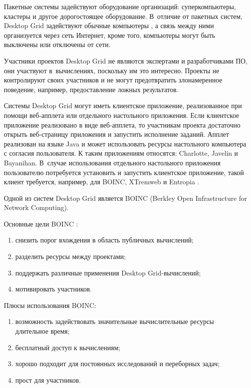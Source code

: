 Пакетные системы задействуют оборудование организаций: суперкомпьютеры, кластеры и другое дорогостоящее оборудование. В~отличие от пакетных систем, Desktop Grid задействуют обычные компьютеры \cite{Anderson2004Boinc}, а связь между ними организуется через сеть Интернет, кроме того,  компьютеры могут быть выключены или отключены от сети. 

Участники проектов Desktop Grid не являются экспертами и разработчиками ПО, они участвуют в~вычислениях, поскольку им это интересно. Проекты не контролируют своих участников и не могут предотвратить злонамеренное поведение, например, предоставление ложных результатов. 



Системы Desktop Grid могут иметь клиентское приложение, реализованное при помощи веб-апплета или отдельного настольного приложения. Если клиентское приложение реализовано в виде веб-апплета, то участникам проекта достаточно открыть веб-страницу приложения и запустить исполнение заданий. Апплет реализован на языке Java и может использовать ресурсы настольного компьютера с согласия пользователя. К таким приложениям относятся: Charlotte, Javelin и Bayanihan.  В~случае использования отдельного настольного приложения пользователю потребуется установить и запустить клиентское приложение, такой клиент требуется, например, для BOINC, XTremweb и Entropia \cite{Choi2007DesktopGrid}. 



Одной из систем Desktop Grid является BOINC (Berkley Open Infrastructure for Network Computing).

Основные цели BOINC \cite{Korpela2012Seti}:

\begin{enumerate}

\item снизить порог вхождения в область публичных вычислений;

\item разделить ресурсы между проектами;

\item поддержать различные применения Desktop Grid-вычислений;

\item мотивировать участников.

\end{enumerate}

Плюсы использования BOINC:

\begin{enumerate}

\item возможность задействовать значительные вычислительные ресурсы длительное время;

\item бесплатный доступ к вычислениям;

\item хорошо подходит для постоянных исследований и переборных задач;

\item прост для участников.

\end{enumerate}

